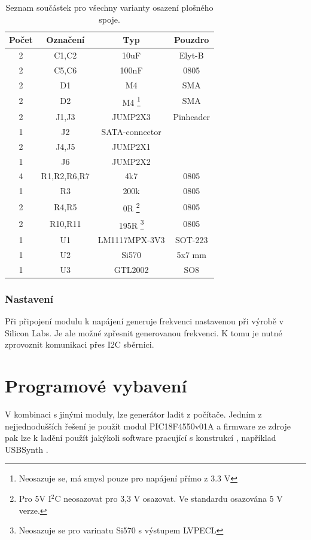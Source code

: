 \documentclass[12pt,a4paper,oneside]{article}
\begin{document}
\begin{savenotes}
\begin{table}[h!]
\begin{center}
\begin{tabular}{ |c|c|c|c| }
\hline 
Počet & Označení & Typ  & Pouzdro  \\ 
\hline 
2 & C1,C2 & 10uF & Elyt-B \\
2 &	C5,C6 & 100nF & 0805 \\
2 &	D1 & M4 & SMA \\
2 &	D2 & M4 \footnote{ Neosazuje se, má smysl pouze pro napájení přímo z 3.3 V} & SMA \\
2 & J1,J3 & JUMP2X3 & Pinheader \\
1 &	J2 & SATA-connector & \\ 
2 &	J4,J5 & JUMP2X1 & \\
1 &	J6 & JUMP2X2 & \\
4 & R1,R2,R6,R7 & 4k7 & 0805 \\
1 &	R3 & 200k & 0805 \\
2 &	R4,R5 & 0R \footnote{ Pro 5V I$^2$C neosazovat pro 3,3 V osazovat. Ve standardu osazována 5 V verze.} & 0805\\
2 &	R10,R11 & 195R \footnote{ Neosazuje se pro varinatu Si570 s výstupem LVPECL} & 0805 \\
1 &	U1 & LM1117MPX-3V3 & SOT-223 \\
1 & U2 & Si570 & 5x7 mm \\
1 &	U3 & GTL2002 & SO8 \\
\hline 
\end{tabular}
\end{center}
\caption{Seznam součástek pro všechny varianty osazení plošného spoje.}
\label{seznam_soucastek}
\end{table}
\end{savenotes}

\newpage

\subsubsection{Nastavení}
Při připojení modulu k napájení generuje frekvenci nastavenou při výrobě v Silicon Labs. Je ale možné zpřesnit generovanou frekvenci. K tomu je nutné zprovoznit komunikaci přes I2C sběrnici. 

\section{Programové vybavení}
V kombinaci s jinými moduly, lze generátor ladit z počítače. Jedním z nejjednodušších řešení je použít modul PIC18F4550v01A a firmware ze zdroje \cite{DG8SAQemulator} pak lze k ladění použít jakýkoli software pracující s konstrukcí \cite{DG8SAQSynthesizer}, například USBSynth \cite{USB_Synth}.
\end{document}
